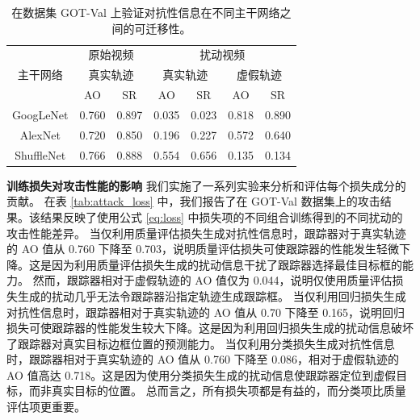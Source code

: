 \begin{table}[t]
\centering
\caption{在数据集 GOT-Val 上验证对抗性信息在不同主干网络之间的可迁移性。}
\begin{tabular}{c cc cc cc} 
\toprule
\multirow{3}{*}[-6pt]{主干网络} & \multicolumn{2}{c}{原始视频}    & \multicolumn{4}{c}{扰动视频}                                        \\ 
\cmidrule(lr){2-3} \cmidrule(lr){4-7}
                          & \multicolumn{2}{c}{真实轨迹} & \multicolumn{2}{c}{真实轨迹} & \multicolumn{2}{c}{虚假轨迹}  \\ 
\cmidrule(lr){2-3} \cmidrule(lr){4-7}
                          & AO    & SR                           & AO    & SR                           & AO    & SR                           \\ 
\midrule
GoogLeNet                 & 0.760 & 0.897                        & 0.035 & 0.023                        & 0.818 & 0.890                        \\
AlexNet                   & 0.720 & 0.850                        & 0.196 & 0.227                        & 0.572 & 0.640                        \\
ShuffleNet                & 0.766 & 0.888                        & 0.554 & 0.656                        & 0.135 & 0.134                        \\
\bottomrule
\end{tabular}
\label{tab:backbone}
\end{table}

\textbf{训练损失对攻击性能的影响} 我们实施了一系列实验来分析和评估每个损失成分的贡献。
在表 \ref{tab:attack_loss} 中，我们报告了在 GOT-Val 数据集上的攻击结果。该结果反映了使用公式 \ref{eq:loss} 中损失项的不同组合训练得到的不同扰动的攻击性能差异。
当仅利用质量评估损失生成对抗性信息时，跟踪器对于真实轨迹的 AO 值从 0.760 下降至 0.703，说明质量评估损失可使跟踪器的性能发生轻微下降。这是因为利用质量评估损失生成的扰动信息干扰了跟踪器选择最佳目标框的能力。
然而，跟踪器相对于虚假轨迹的 AO 值仅为 0.044，说明仅使用质量评估损失生成的扰动几乎无法令跟踪器沿指定轨迹生成跟踪框。
当仅利用回归损失生成对抗性信息时，跟踪器相对于真实轨迹的 AO 值从 0.70 下降至 0.165，说明回归损失可使跟踪器的性能发生较大下降。这是因为利用回归损失生成的扰动信息破坏了跟踪器对真实目标边框位置的预测能力。
当仅利用分类损失生成对抗性信息时，跟踪器相对于真实轨迹的 AO 值从 0.760 下降至 0.086，相对于虚假轨迹的 AO 值高达 0.718。这是因为使用分类损失生成的扰动信息使跟踪器定位到虚假目标，而非真实目标的位置。
总而言之，所有损失项都是有益的，而分类项比质量评估项更重要。


